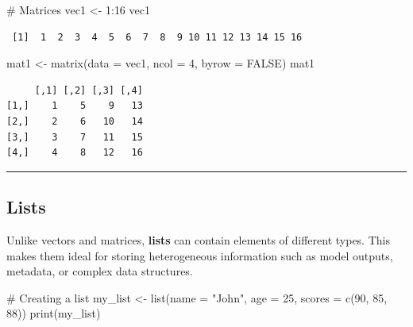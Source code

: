\documentclass[
  letterpaper,
  DIV=11,
  numbers=noendperiod]{scrartcl}
\newenvironment{Shaded}{\begin{snugshade}}{\end{snugshade}}
\newcommand{\AttributeTok}[1]{\textcolor[rgb]{0.40,0.45,0.13}{#1}}
\newcommand{\CommentTok}[1]{\textcolor[rgb]{0.37,0.37,0.37}{#1}}
\newcommand{\ConstantTok}[1]{\textcolor[rgb]{0.56,0.35,0.01}{#1}}
\newcommand{\DecValTok}[1]{\textcolor[rgb]{0.68,0.00,0.00}{#1}}
\newcommand{\FunctionTok}[1]{\textcolor[rgb]{0.28,0.35,0.67}{#1}}
\newcommand{\NormalTok}[1]{\textcolor[rgb]{0.00,0.23,0.31}{#1}}
\newcommand{\OtherTok}[1]{\textcolor[rgb]{0.00,0.23,0.31}{#1}}
\newcommand{\SpecialCharTok}[1]{\textcolor[rgb]{0.37,0.37,0.37}{#1}}
\newcommand{\StringTok}[1]{\textcolor[rgb]{0.13,0.47,0.30}{#1}}
\begin{document}
\begin{Shaded}
\begin{Highlighting}[]
\CommentTok{\# Matrices}
\NormalTok{vec1 }\OtherTok{\textless{}{-}} \DecValTok{1}\SpecialCharTok{:}\DecValTok{16} 
\NormalTok{vec1 }
\end{Highlighting}
\end{Shaded}

\begin{verbatim}
 [1]  1  2  3  4  5  6  7  8  9 10 11 12 13 14 15 16
\end{verbatim}

\begin{Shaded}
\begin{Highlighting}[]
\NormalTok{mat1 }\OtherTok{\textless{}{-}} \FunctionTok{matrix}\NormalTok{(}\AttributeTok{data =}\NormalTok{ vec1, }
               \AttributeTok{ncol =} \DecValTok{4}\NormalTok{, }
               \AttributeTok{byrow =} \ConstantTok{FALSE}\NormalTok{) }
\NormalTok{mat1}
\end{Highlighting}
\end{Shaded}

\begin{verbatim}
     [,1] [,2] [,3] [,4]
[1,]    1    5    9   13
[2,]    2    6   10   14
[3,]    3    7   11   15
[4,]    4    8   12   16
\end{verbatim}

\begin{center}\rule{0.5\linewidth}{0.5pt}\end{center}

\subsection{Lists}\label{lists}

Unlike vectors and matrices, \textbf{lists} can contain elements of
different types. This makes them ideal for storing heterogeneous
information such as model outputs, metadata, or complex data structures.

\begin{Shaded}
\begin{Highlighting}[]
\CommentTok{\# Creating a list}
\NormalTok{my\_list }\OtherTok{\textless{}{-}} \FunctionTok{list}\NormalTok{(}\AttributeTok{name =} \StringTok{"John"}\NormalTok{, }\AttributeTok{age =} \DecValTok{25}\NormalTok{, }\AttributeTok{scores =} \FunctionTok{c}\NormalTok{(}\DecValTok{90}\NormalTok{, }\DecValTok{85}\NormalTok{, }\DecValTok{88}\NormalTok{))}
\FunctionTok{print}\NormalTok{(my\_list)}
\end{Highlighting}
\end{Shaded}
\end{document}
